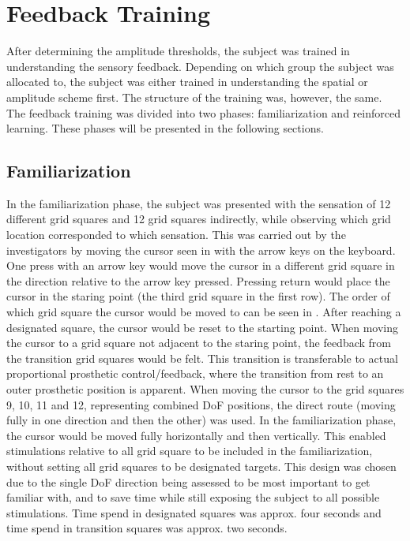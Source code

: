 
\section{Feedback Training}
After determining the amplitude thresholds, the subject was trained in understanding the sensory feedback. Depending on which group the subject was allocated to, the subject was either trained in understanding the spatial or amplitude scheme first. The structure of the training was, however, the same. The feedback training was divided into two phases: familiarization and reinforced learning. These phases will be presented in the following sections.

\subsection{Familiarization} \label{sec:meth:FBtrainingFam}
In the familiarization phase, the subject was presented with the sensation of 12 different grid squares and 12 grid squares indirectly, while observing which grid location corresponded to which sensation. This was carried out by the investigators by moving the cursor seen in  with the arrow keys on the keyboard. One press with an arrow key would move the cursor in a different grid square in the direction relative to the arrow key pressed. Pressing return would place the cursor in the staring point (the third grid square in the first row). The order of which grid square the cursor would be moved to can be seen in . After reaching a designated square, the cursor would be reset to the starting point. When moving the cursor to a grid square not adjacent to the staring point, the feedback from the transition grid squares would be felt. This transition is transferable to actual proportional prosthetic control/feedback, where the transition from rest to an outer prosthetic position is apparent. When moving the cursor to the grid squares 9, 10, 11 and 12, representing combined DoF positions, the direct route (moving fully in one direction and then the other) was used. In the familiarization phase, the cursor would be moved fully horizontally and then vertically. This enabled stimulations relative to all grid square to be included in the familiarization, without setting all grid squares to be designated targets. This design was chosen due to the single DoF direction being assessed to be most important to get familiar with, and to save time while still exposing the subject to all possible stimulations. Time spend in designated squares was approx. four seconds and time spend in transition squares was approx. two seconds.

